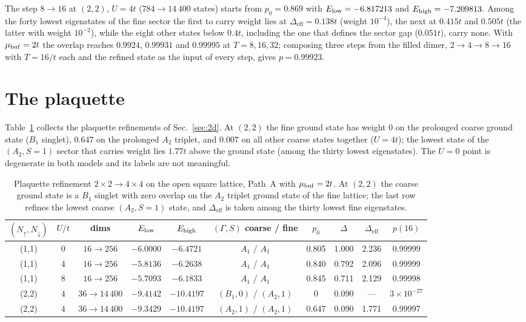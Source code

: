 \documentclass[a4paper,11pt,noarxiv]{quantumarticle}
\newcommand{\Deff}{\Delta_{\mathrm{eff}}}
\begin{document}
The step $8\to16$ at $(2,2)$, $U=4t$ ($784\to14\,400$ states) starts from
$p_0=0.869$ with $E_{\rm low}=-6.817213$ and $E_{\rm high}=-7.209813$.
Among the forty lowest eigenstates of the fine sector the first to carry
weight lies at $\Deff=0.138t$ (weight $10^{-4}$), the next at $0.415t$ and
$0.505t$ (the latter with weight $10^{-2}$), while the eight other states
below $0.4t$, including the one that defines the sector gap ($0.051t$),
carry none.  With $\mu_{\rm buf}=2t$ the overlap reaches $0.9924$, $0.99931$
and $0.99995$ at $T=8,16,32$; composing three steps from the filled dimer,
$2\to4\to8\to16$ with $T=16/t$ each and the refined state as the input of
every step, gives $p=0.99923$.

\section{The plaquette}
\label{sm:2d}
Table~\ref{tab:2d} collects the plaquette refinements of
Sec.~\ref{sec:2d}.  At $(2,2)$ the fine ground state has weight $0$ on the
prolonged coarse ground state ($B_1$ singlet), $0.647$ on the prolonged
$A_2$ triplet, and $0.007$ on all other coarse states together ($U=4t$);
the lowest state of the $(A_2,S=1)$ sector that carries weight lies $1.77t$
above the ground state (among the thirty lowest eigenstates).  The $U=0$
point is degenerate in both models and its labels are not meaningful.

\begin{table}[t]
  \caption{Plaquette refinement $2\times2\to4\times4$ on the open square
  lattice, Path~A with $\mu_{\rm buf}=2t$.  At $(2,2)$ the coarse ground
  state is a $B_1$ singlet with zero overlap on the $A_2$ triplet ground
  state of the fine lattice; the last row refines the lowest coarse
  $(A_2,S=1)$ state, and $\Deff$ is taken among the thirty lowest fine
  eigenstates.}
  \label{tab:2d}
  \centering\scriptsize
  \begin{tabular}{cccccccccc}
  \toprule
  $(N_\uparrow,N_\downarrow)$ & $U/t$ & dims & $E_{\rm low}$ & $E_{\rm high}$ & $(\Gamma,S)$ coarse / fine & $p_0$ & $\Delta$ & $\Deff$ & $p(16)$\\
  \midrule
  (1,1) & 0 & $16\to256$ & $-6.0000$ & $-6.4721$ & $A_1$ / $A_1$ & 0.805 & 1.000 & 2.236 & 0.99999\\
  (1,1) & 4 & $16\to256$ & $-5.8136$ & $-6.2638$ & $A_1$ / $A_1$ & 0.840 & 0.792 & 2.096 & 0.99999\\
  (1,1) & 8 & $16\to256$ & $-5.7093$ & $-6.1833$ & $A_1$ / $A_1$ & 0.845 & 0.711 & 2.129 & 0.99998\\
  (2,2) & 4 & $36\to14\,400$ & $-9.4142$ & $-10.4197$ & $(B_1,0)$ / $(A_2,1)$ & 0 & 0.090 & --- & $3\times10^{-27}$\\
  (2,2) & 4 & $36\to14\,400$ & $-9.3429$ & $-10.4197$ & $(A_2,1)$ / $(A_2,1)$ & 0.647 & 0.090 & 1.771 & 0.99997\\
  \bottomrule
  \end{tabular}
\end{table}
\end{document}
